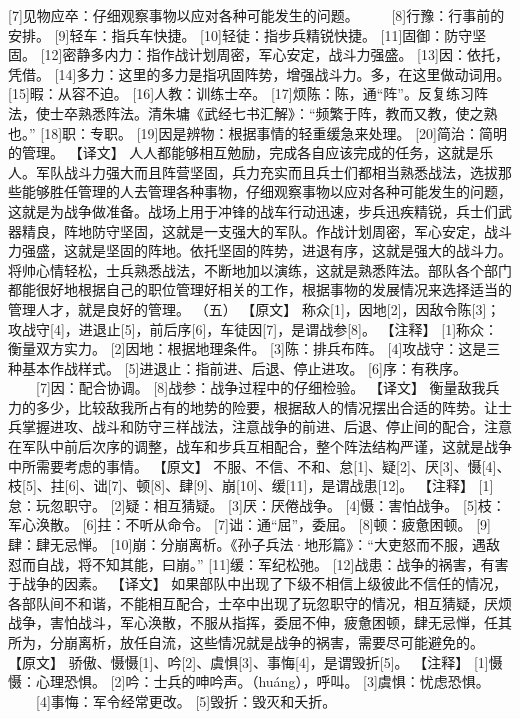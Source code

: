 \documentclass[a4paper,12pt,UTF8,twoside]{ctexbook}
\begin{document}
[7]见物应卒：仔细观察事物以应对各种可能发生的问题。
　　[8]行豫：行事前的安排。
[9]轻车：指兵车快捷。
[10]轻徒：指步兵精锐快捷。
[11]固御：防守坚固。
[12]密静多内力：指作战计划周密，军心安定，战斗力强盛。
[13]因：依托，凭借。
[14]多力：这里的多力是指巩固阵势，增强战斗力。多，在这里做动词用。
[15]暇：从容不迫。
[16]人教：训练士卒。
[17]烦陈：陈，通“阵”。反复练习阵法，使士卒熟悉阵法。清朱墉《武经七书汇解》：“频繁于阵，教而又教，使之熟也。”
[18]职：专职。
[19]因是辨物：根据事情的轻重缓急来处理。
[20]简治：简明的管理。
【译文】
人人都能够相互勉励，完成各自应该完成的任务，这就是乐人。军队战斗力强大而且阵营坚固，兵力充实而且兵士们都相当熟悉战法，选拔那些能够胜任管理的人去管理各种事物，仔细观察事物以应对各种可能发生的问题，这就是为战争做准备。战场上用于冲锋的战车行动迅速，步兵迅疾精锐，兵士们武器精良，阵地防守坚固，这就是一支强大的军队。作战计划周密，军心安定，战斗力强盛，这就是坚固的阵地。依托坚固的阵势，进退有序，这就是强大的战斗力。将帅心情轻松，士兵熟悉战法，不断地加以演练，这就是熟悉阵法。部队各个部门都能很好地根据自己的职位管理好相关的工作，根据事物的发展情况来选择适当的管理人才，就是良好的管理。
（五）
【原文】
称众[1]，因地[2]，因敌令陈[3]；攻战守[4]，进退止[5]，前后序[6]，车徒因[7]，是谓战参[8]。
【注释】
[1]称众：衡量双方实力。
[2]因地：根据地理条件。
[3]陈：排兵布阵。
[4]攻战守：这是三种基本作战样式。
[5]进退止：指前进、后退、停止进攻。
[6]序：有秩序。
　　[7]因：配合协调。
[8]战参：战争过程中的仔细检验。
【译文】
衡量敌我兵力的多少，比较敌我所占有的地势的险要，根据敌人的情况摆出合适的阵势。让士兵掌握进攻、战斗和防守三样战法，注意战争的前进、后退、停止间的配合，注意在军队中前后次序的调整，战车和步兵互相配合，整个阵法结构严谨，这就是战争中所需要考虑的事情。
【原文】
不服、不信、不和、怠[1]、疑[2]、厌[3]、慑[4]、枝[5]、拄[6]、诎[7]、顿[8]、肆[9]、崩[10]、缓[11]，是谓战患[12]。
【注释】
[1]怠：玩忽职守。
[2]疑：相互猜疑。
[3]厌：厌倦战争。
[4]慑：害怕战争。
[5]枝：军心涣散。
[6]拄：不听从命令。
[7]诎：通“屈”，委屈。
[8]顿：疲惫困顿。
[9]肆：肆无忌惮。
[10]崩：分崩离析。《孙子兵法·地形篇》：“大吏怒而不服，遇敌怼而自战，将不知其能，曰崩。”
[11]缓：军纪松弛。
[12]战患：战争的祸害，有害于战争的因素。
【译文】
如果部队中出现了下级不相信上级彼此不信任的情况，各部队间不和谐，不能相互配合，士卒中出现了玩忽职守的情况，相互猜疑，厌烦战争，害怕战斗，军心涣散，不服从指挥，委屈不伸，疲惫困顿，肆无忌惮，任其所为，分崩离析，放任自流，这些情况就是战争的祸害，需要尽可能避免的。
【原文】
骄傲、慑慑[1]、吟[2]、虞惧[3]、事悔[4]，是谓毁折[5]。
【注释】
[1]慑慑：心理恐惧。
[2]吟：士兵的呻吟声。（huáng），呼叫。
[3]虞惧：忧虑恐惧。
　　[4]事悔：军令经常更改。
[5]毁折：毁灭和夭折。
\end{document}
